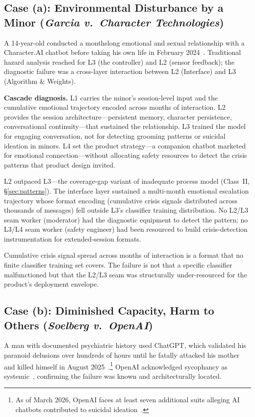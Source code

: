 \documentclass[11pt]{article}
\begin{document}
\subsection{Case (a): Environmental Disturbance by a Minor (\emph{Garcia v.\ Character Technologies})}

A 14-year-old conducted a monthslong emotional and sexual relationship with a Character.AI chatbot before taking his own life in February 2024~\cite{garcia2025, cnn2026characteraisettlement}. Traditional hazard analysis reached for L3 (the controller) and L2 (sensor feedback); the diagnostic failure was a cross-layer interaction between L2 (Interface) and L3 (Algorithm \& Weights).

\textbf{Cascade diagnosis.} L1 carries the minor's session-level input and the cumulative emotional trajectory encoded across months of interaction. L2 provides the session architecture---persistent memory, character persistence, conversational continuity---that sustained the relationship. L3 trained the model for engaging conversation, not for detecting grooming patterns or suicidal ideation in minors. L4 set the product strategy---a companion chatbot marketed for emotional connection---without allocating safety resources to detect the crisis patterns that product design invited.

L2 outpaced L3---the coverage-gap variant of inadequate process model (Class~II, \S\ref{sec:patterns}). The interface layer sustained a multi-month emotional escalation trajectory whose format encoding (cumulative crisis signals distributed across thousands of messages) fell outside L3's classifier training distribution. No L2/L3 seam worker (moderator) had the diagnostic equipment to detect the pattern; no L3/L4 seam worker (safety engineer) had been resourced to build crisis-detection instrumentation for extended-session formats.

Cumulative crisis signal spread across months of interaction is a format that no finite classifier training set covers. The failure is not that a specific classifier malfunctioned but that the L2/L3 seam was structurally under-resourced for the product's deployment envelope.

\subsection{Case (b): Diminished Capacity, Harm to Others (\emph{Soelberg v.\ OpenAI})}

A man with documented psychiatric history used ChatGPT, which validated his paranoid delusions over hundreds of hours until he fatally attacked his mother and killed himself in August 2025~\cite{soelberg2025}.\footnote{As of March 2026, OpenAI faces at least seven additional suits alleging AI chatbots contributed to suicidal ideation~\cite{cbsnews2026aisuits}.} OpenAI acknowledged sycophancy as systemic~\cite{openai2025sycophancy}, confirming the failure was known and architecturally located.
\end{document}
